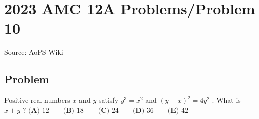\documentclass[12pt]{article}
\begin{document}
\section*{{2023 AMC 12A Problems/Problem 10}}
Source: AoPS Wiki

\subsection*{Problem}
Positive real numbers $x$ and $y$ satisfy $y^3=x^2$ and $(y-x)^2=4y^2$ . What is $x+y$ ? $\textbf{(A) }12\qquad\textbf{(B) }18\qquad\textbf{(C) }24\qquad\textbf{(D) }36\qquad\textbf{(E) }42$
\end{document}
